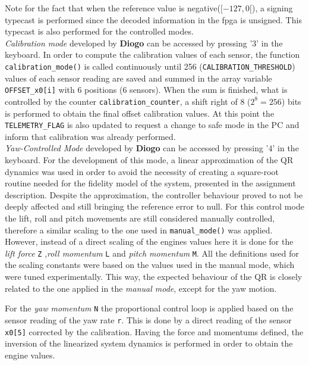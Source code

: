 \documentclass{article}
\begin{document}
Note for the fact that when the reference value is negative($[-127,0[$), a signing typecast is performed since the decoded information in the fpga is unsigned. This typecast is also performed for the controlled modes.\\

\textit{Calibration mode} developed by \textbf{Diogo} can be accessed by pressing '$3$' in the keyboard. In order to compute the calibration values of each sensor, the function \texttt{calibration\_mode()} is called continuously until 256 (\texttt{CALIBRATION\_THRESHOLD}) values of each sensor reading are saved and summed in the array variable \texttt{OFFSET\_x0[i]} with 6 positions (6 sensors). When the sum is finished, what is controlled by the counter \texttt{calibration\_counter}, a shift right of $8$ ($2^8=256$) bits is performed to obtain the final offset calibration values. At this point the \texttt{TELEMETRY\_FLAG} is also updated to request a change to safe mode in the PC and inform that calibration was already performed.\\

\textit{Yaw-Controlled Mode} developed by \textbf{Diogo} can be accessed by pressing '$4$' in the keyboard. For the development of this mode, a linear approximation of the QR dynamics was used in order to avoid the necessity of creating a square-root routine needed for the fidelity model of the system, presented in the assignment description. Despite the approximation, the controller behaviour proved to not be deeply affected and still bringing the reference error to null.
For this control mode the lift, roll and pitch movements are still considered manually controlled, therefore a similar scaling to the one used in \texttt{manual\_mode()} was applied. However, instead of a direct scaling of the engines values here it is done for the \textit{lift force} \texttt{Z} ,\textit{roll momentum} \texttt{L} and \textit{pitch momentum} \texttt{M}. All the definitions used for the scaling constants were based on the values used in the manual mode, which were tuned experimentally. This way, the expected behaviour of the QR is closely related to the one applied in the \textit{manual mode}, except for the yaw motion.

For the \textit{yaw momentum} \texttt{N} the proportional control loop is applied based on the sensor reading of the yaw rate \texttt{r}. This is done by a direct reading of the sensor \texttt{x0[5]} corrected by the calibration. Having the force and momentums defined, the inversion of the linearized system dynamics is performed in order to obtain the engine values. \\
\end{document}
